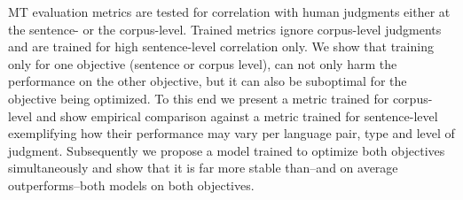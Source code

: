 MT evaluation metrics are tested for correlation with human judgments either at the sentence- or the corpus-level. Trained metrics ignore corpus-level judgments and are trained for high sentence-level correlation only. We show that training only for one objective (sentence or corpus level), can not only harm the performance on the other objective, but it can also be suboptimal for the objective being optimized. To this end we present a metric trained for corpus-level and show empirical comparison against a metric trained for sentence-level exemplifying how their performance may vary per language pair, type and level of judgment. Subsequently we propose a model trained to optimize both objectives simultaneously and show that it is far more stable than--and on average outperforms--both models on both objectives.
